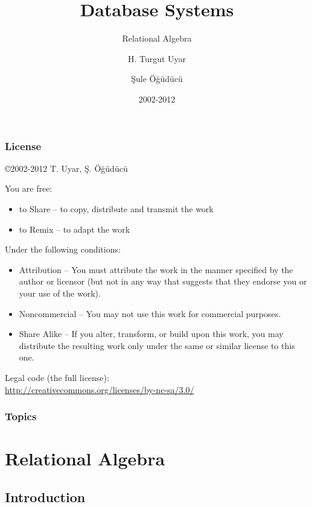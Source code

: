\documentclass[dvipsnames]{beamer}
\title{Database Systems}
\subtitle{Relational Algebra}
\author{H. Turgut Uyar \and Şule Öğüdücü}
\date{2002-2012}
\theoremstyle{plain}
\begin{document}
\begin{frame}
  \titlepage
\end{frame}

\begin{frame}
  \frametitle{License}

  \hfill
  \copyright 2002-2012 T. Uyar, Ş. Öğüdücü

  \vfill
  \begin{tiny}
    You are free:
    \begin{itemize}
      \item to Share -- to copy, distribute and transmit the work
      \item to Remix -- to adapt the work
    \end{itemize}

    Under the following conditions:
    \begin{itemize}
      \item Attribution -- You must attribute the work in the manner specified by
        the author or licensor (but not in any way that suggests that they
        endorse you or your use of the work).

      \item Noncommercial -- You may not use this work for commercial purposes.

      \item Share Alike -- If you alter, transform, or build upon this work, you
        may distribute the resulting work only under the same or similar license
        to this one.
    \end{itemize}
  \end{tiny}

  \vfill
  Legal code (the full license):\\
  \url{http://creativecommons.org/licenses/by-nc-sa/3.0/}
\end{frame}

\begin{frame}
  \frametitle{Topics}
  \tableofcontents
\end{frame}

\lstset{language=TutorialD}

\section{Relational Algebra}

\subsection{Introduction}
\end{document}
